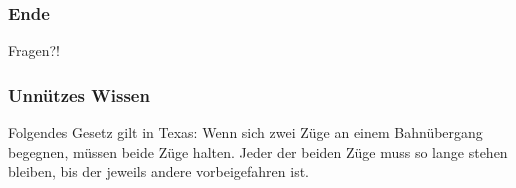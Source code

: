 \documentclass{beamer}
\begin{document}
\begin {frame}
\frametitle {Ende}
\begin {center}
Fragen?! \\
\end {center}
\end {frame}
\begin{frame}
\frametitle{Unnützes Wissen}
\begin{block}{}
\begin{center}
Folgendes Gesetz gilt in Texas: Wenn sich zwei Züge an einem Bahnübergang begegnen, müssen beide Züge halten. Jeder der beiden Züge muss so lange stehen bleiben, bis der jeweils andere vorbeigefahren ist.
\end{center}
\end{block}{}
\end{frame}
\end{document}

